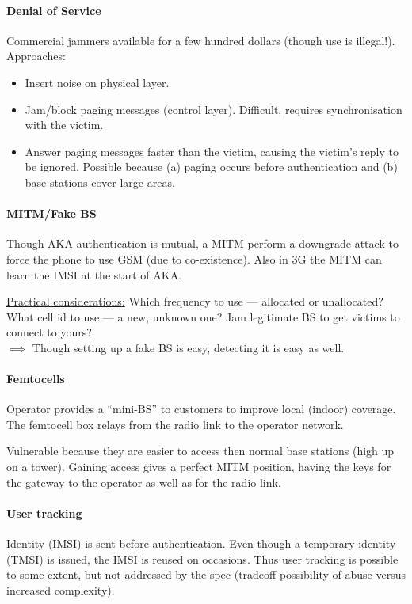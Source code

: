 \paragraph{Denial of Service}
Commercial jammers available for a few hundred dollars (though use is
illegal!). \\ Approaches:
\begin{itemize}
	\item Insert noise on physical layer.
	\item Jam/block paging messages (control layer). Difficult, requires synchronisation
	      with the victim.
	\item Answer paging messages faster than the victim, causing the victim's reply to be
	      ignored. Possible because (a) paging occurs before authentication and (b) base
	      stations cover large areas.
\end{itemize}

\paragraph{MITM/Fake BS}
Though AKA authentication is mutual, a MITM perform a downgrade attack to force
the phone to use GSM (due to co-existence). Also in 3G the MITM can learn the
IMSI at the start of AKA.

\underline{Practical considerations:}
Which frequency to use --- allocated or unallocated?
What cell id to use --- a new, unknown one?
Jam legitimate BS to get victims to connect to yours?
\\
$\implies$ Though setting up a fake BS is easy, detecting it is easy as well.

\paragraph{Femtocells}
Operator provides a ``mini-BS'' to customers to improve local (indoor)
coverage. The femtocell box relays from the radio link to the operator network.

Vulnerable because they are easier to access then normal base stations (high up
on a tower). Gaining access gives a perfect MITM position, having the keys for
the gateway to the operator as well as for the radio link.

\paragraph{User tracking}
Identity (IMSI) is sent before authentication. Even though a temporary identity
(TMSI) is issued, the IMSI is reused on occasions. Thus user tracking is
possible to some extent, but not addressed by the spec (tradeoff possibility of
abuse versus increased complexity).

